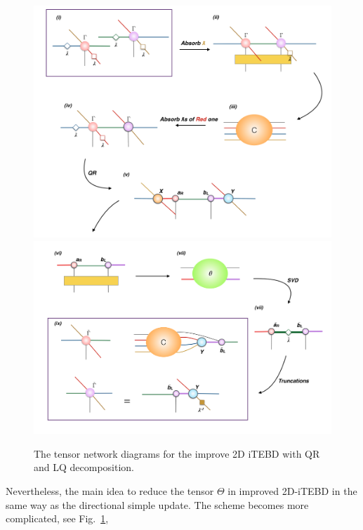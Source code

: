 \begin{figure}[!ht]
	\centering
	\includegraphics[width=1.00\textwidth]{figures/fig319.png}
	\includegraphics[width=1.00\textwidth]{figures/fig320.png}
	\caption[The tensor network diagrams for the improve 2D iTEBD with QR and LQ decomposition]{The tensor network diagrams for the improve 2D iTEBD with QR and LQ decomposition.}
	\label{fig320}
\end{figure}

Nevertheless, the main idea to reduce the tensor $\Theta$ in improved 2D-iTEBD in the same way as the directional simple update. The scheme becomes more complicated, see Fig.~\ref{fig320}, 

